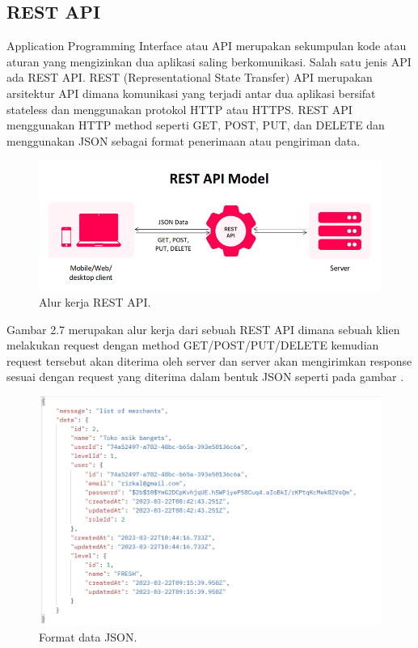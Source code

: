   \subsection{REST API}
  Application Programming Interface atau API merupakan sekumpulan kode atau aturan yang mengizinkan dua aplikasi saling berkomunikasi. Salah satu jenis API ada REST API. REST (Representational State Transfer) API merupakan arsitektur API dimana komunikasi yang terjadi antar dua aplikasi bersifat stateless dan menggunakan protokol HTTP atau HTTPS. REST API menggunakan HTTP method seperti GET, POST, PUT, dan DELETE dan menggunakan JSON sebagai format penerimaan atau pengiriman data.

  \begin{figure}[H]
    \centering
      \includegraphics[scale=0.5]{gambar/rest-api}
      \caption{Alur kerja REST API.}
      \label{Alur kerja REST API.}
  \end{figure}

  Gambar 2.7 merupakan alur kerja dari sebuah REST API dimana sebuah klien melakukan request dengan method GET/POST/PUT/DELETE kemudian request tersebut akan diterima oleh server dan server akan mengirimkan response sesuai dengan request yang diterima dalam bentuk JSON seperti pada gambar .

  \begin{figure}[H]
    \centering
      \includegraphics[scale=0.7]{gambar/json-example}
      \caption{Format data JSON.}
      \label{Format data JSON.}
  \end{figure}
  
